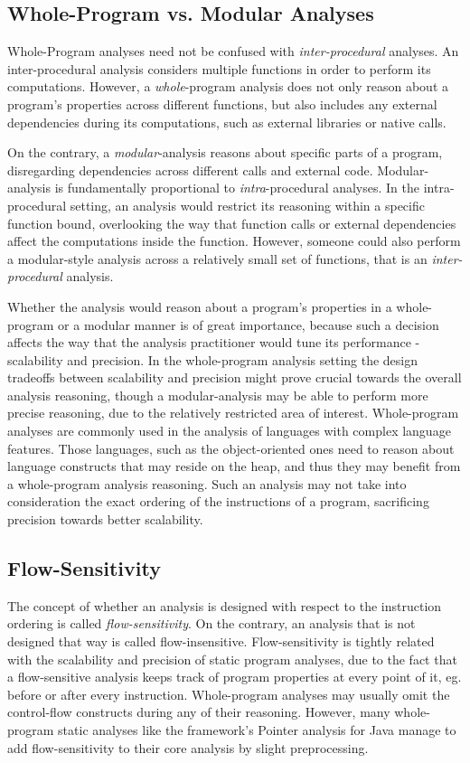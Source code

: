 \subsection{Whole-Program vs. Modular Analyses}

Whole-Program analyses need not be confused with \emph{inter-procedural} analyses. 
An inter-procedural analysis considers multiple functions in order to perform
its computations. However, a \emph{whole}-program analysis does not only reason
about a program's properties across different functions, but also includes any 
external dependencies during its computations, such as external libraries or 
native calls.

On the contrary, a \emph{modular}-analysis reasons about specific parts of a
program, disregarding dependencies across different calls and external code.
Modular-analysis is fundamentally proportional to \emph{intra}-procedural analyses.
In the intra-procedural setting, an analysis would restrict its reasoning within
a specific function bound, overlooking the way that function calls or external
dependencies affect the computations inside the function. However, someone could
also perform a modular-style analysis across a relatively small set of functions,
that is an \emph{inter-procedural} analysis.

Whether the analysis would reason about a program's properties in a whole-program
or a modular manner is of great importance, because such a decision affects the
way that the analysis practitioner would tune its performance - scalability and
precision. In the whole-program analysis setting the design tradeoffs between
scalability and precision might prove crucial towards the overall analysis
reasoning, though a modular-analysis may be able to perform more precise reasoning,
due to the relatively restricted area of interest. Whole-program analyses are
commonly used in the analysis of languages with complex language features. Those
languages, such as the object-oriented ones need to reason about language constructs
that may reside on the heap, and thus they may benefit from a whole-program analysis
reasoning. Such an analysis may not take into consideration the
exact ordering of the instructions of a program, sacrificing precision towards
better scalability.

\subsection{Flow-Sensitivity}

The concept of whether an analysis is designed with respect to
the instruction ordering is called \emph{flow-sensitivity}.
On the contrary, an analysis that is not designed that way is
called flow-insensitive. Flow-sensitivity is tightly related with
the scalability and precision of static program analyses, due to the
fact that a flow-sensitive analysis keeps track of program properties
at every point of it, eg. before or after every instruction.
Whole-program analyses may usually omit the control-flow constructs
during any of their reasoning. However, many whole-program static
analyses like the \doop{} framework's Pointer analysis for Java
manage to add flow-sensitivity to their core analysis by slight
preprocessing\cite{points-to15}.

